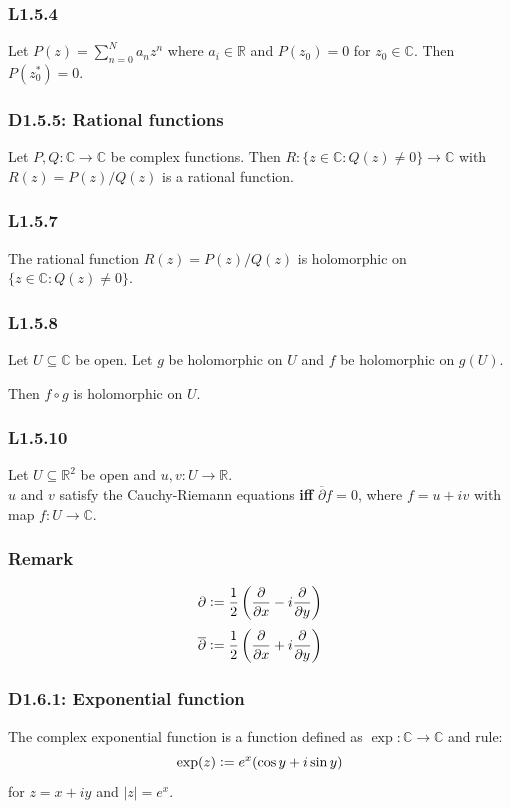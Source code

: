 \documentclass{article}
\newcommand{\deq}{\vcentcolon=}
\begin{document}
\begin{multicols*}{3}
\subsubsection*{L1.5.4}
Let $\displaystyle P(z)=\sum_{n=0}^{N}a_n z^n$ where $a_i\in\mathbb{R}$
and $P(z_0)=0$ for $z_0\in\mathbb{C}$.
Then $P(z^*_0)=0$.

\subsubsection*{D1.5.5: Rational functions}
Let $P,Q:\mathbb{C}\rightarrow\mathbb{C}$ be complex functions.
Then $R:\{z\in\mathbb{C}:Q(z)\neq0\}\rightarrow\mathbb{C}$
with $R(z)=P(z)/Q(z)$ is a rational function.

\subsubsection*{L1.5.7}
The rational function $R(z)=P(z)/Q(z)$
is holomorphic on $\{z\in\mathbb{C}:Q(z)\neq0\}$.

\subsubsection*{L1.5.8}
Let $U\subseteq\mathbb{C}$ be open.
Let $g$ be holomorphic on $U$ and $f$ be holomorphic on $g(U)$.

Then $f\circ g$ is holomorphic on $U$.

\subsubsection*{L1.5.10}
Let $U\subseteq\mathbb{R}^2$ be open
and $u,v:U\rightarrow\mathbb{R}$. \\
$u$ and $v$ satisfy the Cauchy-Riemann equations
\textbf{if{}f} $\overline{\partial}f=0$, where
$f=u+iv$ with map $f:U\rightarrow\mathbb{C}$.

\subsubsection*{Remark}
$$\partial\deq\frac{1}{2}\left(\frac{\partial}{\partial x}
-i\frac{\partial}{\partial y}\right)$$
$$\overline{\partial}\deq\frac{1}{2}\left(\frac{\partial}{\partial x}
+i\frac{\partial}{\partial y}\right)$$

\subsubsection*{D1.6.1: Exponential function}
The complex exponential function is a function defined as
$\exp:\mathbb{C}\rightarrow\mathbb{C}$ and rule:
$$\exp(z)\deq e^x(\cos y+i\sin y)$$
for $z=x+iy$ and $|z|=e^x$.


\end{multicols*}
\end{document}
